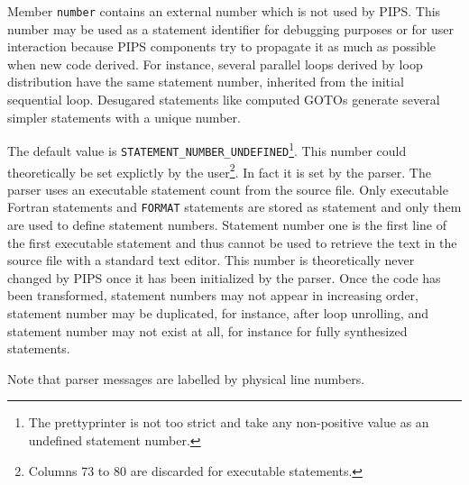 \documentclass[a4paper]{article}
\begin{document}
\begin{comment}
Le domaine \verb/statement/ permet de
rep�rer les instructions d'un module.  Le sous-domaine \verb/label/
contient une entit� qui d�finit le label\footnote{Un statement dont
l'instruction est un \verb/block/ ou un \verb/unstructured/ n'a jamais
de label.}. Un label sp�cial est d�fini pour les RETURN, ce qui permet
de convertir les appels � RETURN en des branchements � ce label
sp�cial. Un autre label sp�cial, \verb/empty_label/, est utilis� pour
les statements sans label.
\end{comment}

Member \texttt{number} contains an external number which is not used by
PIPS. This number may be used as a statement identifier for debugging
purposes or for user interaction because PIPS components try to propagate
it as much as possible when new code derived. For instance, several
parallel loops derived by loop distribution have the same statement
number, inherited from the initial sequential loop. Desugared statements
like computed GOTOs generate several simpler statements with a unique number.

The default value is \verb+STATEMENT_NUMBER_UNDEFINED+\footnote{The
prettyprinter is not too strict and take any non-positive value as an
undefined statement number.}. This number could theoretically be set
explictly by the user\footnote{Columns 73 to 80 are discarded for
executable statements.}. In fact it is set by the parser. The parser
uses an executable statement count from the source file. Only executable
Fortran statements and \verb/FORMAT/ statements are stored as statement
and only them are used to define statement numbers. Statement number one
is the first line of the first executable statement and thus cannot be
used to retrieve the text in the source file with a standard text editor.
This number is theoretically never changed by PIPS once it has been
initialized by the parser. Once the code has been transformed, statement
numbers may not appear in increasing order, statement number may be
duplicated, for instance, after loop unrolling, and statement number may
not exist at all, for instance for fully synthesized statements.

Note that parser messages are labelled by physical line numbers.

\begin{comment}
Le sous-domaine \verb/number/ contient un num�ro permettant de rep�rer
le statement pour le debugging ou l'information de l'utilisateur (valeur
par defaut: \verb+STATEMENT_NUMBER_UNDEFINED+). Ce num�ro est d�fini
par l'utilisateur ou implicitement par le parser qui prend le num�ro de
la premi�re ligne de l'instruction dans le fichier source. Il n'est (en
principe) jamais modifi� par PIPS. Apr�s d�roulage de boucle,
plusieurs \verb/statement/s peuvent avoir le m�me num�ro.
\end{comment}
\end{document}
